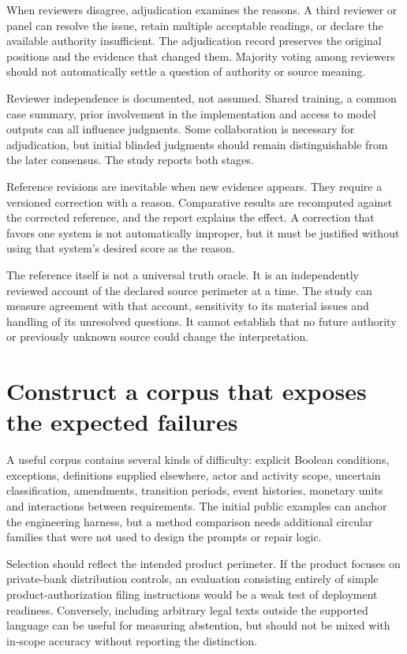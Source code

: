 \documentclass[12pt,a4paper,oneside,openany]{book}
\begin{document}
When reviewers disagree, adjudication examines the reasons. A third reviewer or
panel can resolve the issue, retain multiple acceptable readings, or declare the
available authority insufficient. The adjudication record preserves the original
positions and the evidence that changed them. Majority voting among reviewers
should not automatically settle a question of authority or source meaning.

Reviewer independence is documented, not assumed. Shared training, a common case
summary, prior involvement in the implementation and access to model outputs can
all influence judgments. Some collaboration is necessary for adjudication, but
initial blinded judgments should remain distinguishable from the later consensus.
The study reports both stages.

Reference revisions are inevitable when new evidence appears. They require a
versioned correction with a reason. Comparative results are recomputed against
the corrected reference, and the report explains the effect. A correction that
favors one system is not automatically improper, but it must be justified without
using that system's desired score as the reason.

The reference itself is not a universal truth oracle. It is an independently
reviewed account of the declared source perimeter at a time. The study can measure
agreement with that account, sensitivity to its material issues and handling of
its unresolved questions. It cannot establish that no future authority or
previously unknown source could change the interpretation.

\section{Construct a corpus that exposes the expected failures}
\label{merge:M09:03}


A useful corpus contains several kinds of difficulty: explicit Boolean conditions,
exceptions, definitions supplied elsewhere, actor and activity scope, uncertain
classification, amendments, transition periods, event histories, monetary units
and interactions between requirements. The initial public examples can anchor the
engineering harness, but a method comparison needs additional circular families
that were not used to design the prompts or repair logic.

Selection should reflect the intended product perimeter. If the product focuses
on private-bank distribution controls, an evaluation consisting entirely of simple
product-authorization filing instructions would be a weak test of deployment
readiness. Conversely, including arbitrary legal texts outside the supported
language can be useful for measuring abstention, but should not be mixed with
in-scope accuracy without reporting the distinction.
\end{document}
